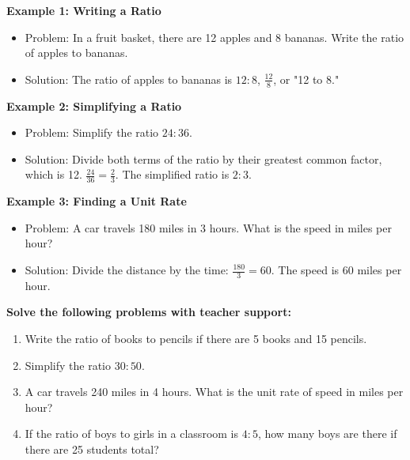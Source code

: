 \documentclass[12pt]{article}
\begin{document}
\begin{tcolorbox}[colframe=black!60, colback=white, 
coltitle=black, colbacktitle=black!15, fonttitle=\bfseries\Large, 
title=Examples, halign title=center, left=10pt, right=10pt, top=10pt, bottom=15pt]
\textbf{Example 1: Writing a Ratio}
\begin{itemize}
    \item Problem: In a fruit basket, there are 12 apples and 8 bananas. Write the ratio of apples to bananas.
    \item Solution: The ratio of apples to bananas is \( 12:8 \), \( \frac{12}{8} \), or "12 to 8."
\end{itemize}

\textbf{Example 2: Simplifying a Ratio}
\begin{itemize}
    \item Problem: Simplify the ratio \( 24:36 \).
    \item Solution: Divide both terms of the ratio by their greatest common factor, which is 12. \( \frac{24}{36} = \frac{2}{3} \). The simplified ratio is \( 2:3 \).
\end{itemize}

\textbf{Example 3: Finding a Unit Rate}
\begin{itemize}
    \item Problem: A car travels 180 miles in 3 hours. What is the speed in miles per hour?
    \item Solution: Divide the distance by the time: \( \frac{180}{3} = 60 \). The speed is 60 miles per hour.
\end{itemize}
\end{tcolorbox}

\begin{tcolorbox}[colframe=black!60, colback=white, 
coltitle=black, colbacktitle=black!15, fonttitle=\bfseries\Large, 
title=Guided Practice, halign title=center, left=10pt, right=10pt, top=10pt, bottom=45pt]
\textbf{Solve the following problems with teacher support:}
\begin{enumerate}[itemsep=3em]
    \item Write the ratio of books to pencils if there are 5 books and 15 pencils.
    \item Simplify the ratio \( 30:50 \).
    \item A car travels 240 miles in 4 hours. What is the unit rate of speed in miles per hour?
    \item If the ratio of boys to girls in a classroom is \( 4:5 \), how many boys are there if there are 25 students total?
\end{enumerate}
\end{tcolorbox}
\end{document}

